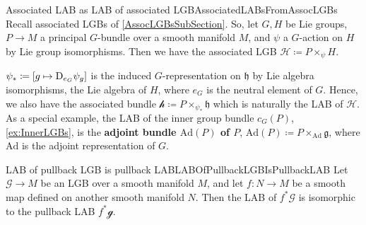 \documentclass[reqno,a4paper,oneside]{amsart}
\newcommand{\e}{\ensuremath{\mathrm{e\;\!}}}
\theoremstyle{plain}
\theoremstyle{remark}
\theoremstyle{definition}
\def\bas#1\eas{\begin{align*}#1\end{align*}}
\begin{document}
\begin{examples}{Associated LAB as LAB of associated LGB}{AssociatedLABsFromAssocLGBs}
Recall associated LGBs of \ref{AssocLGBsSubSection}. So, let $G, H$ be Lie groups, $P \to M$ a principal $G$-bundle over a smooth manifold $M$, and $\psi$ a $G$-action on $H$ by Lie group isomorphisms. Then we have the associated LGB $\mathcal{H} \coloneqq P \times_\psi H$.

$\psi_* \coloneqq \mleft[ g \mapsto \mathrm{D}_{e_G}\psi_g \mright]$ is the induced $G$-representation on $\mathfrak{h}$ by Lie algebra isomorphisms, the Lie algebra of $H$, where $e_G$ is the neutral element of $G$. Hence, we also have the associated bundle $\mathcal{h} \coloneqq P \times_{\psi_*} \mathfrak{h}$ which is naturally the LAB of $\mathcal{H}$.
%
%
As a special example, the LAB of the inner group bundle $c_G(P)$, \ref{ex:InnerLGBs}, is the \textbf{adjoint bundle $\mathrm{Ad}(P)$ of $P$}, $\mathrm{Ad}(P) \coloneqq P \times_{\mathrm{Ad}} \mathfrak{g}$, where $\mathrm{Ad}$ is the adjoint representation of $G$.
\end{examples}

\begin{examples}{LAB of pullback LGB is pullback LAB}{LABOfPullbackLGBIsPullbackLAB}
Let $\mathcal{G} \to M$ be an LGB over a smooth manifold $M$, and let $f\colon N \to M$ be a smooth map defined on another smooth manifold $N$. Then the LAB of $f^*\mathcal{G}$ is isomorphic to the pullback LAB $f^*\mathcal{g}$.
\end{examples}
\end{document}

